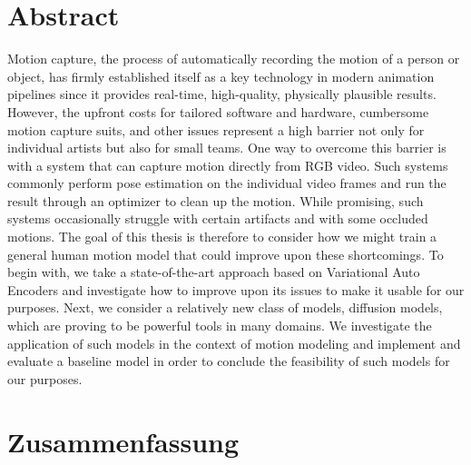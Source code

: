 \chapter*{Abstract}

Motion capture, the process of automatically recording the motion of a person or object, has firmly established itself as a key technology in modern animation pipelines since it provides real-time, high-quality, physically plausible results. However, the upfront costs for tailored software and hardware, cumbersome motion capture suits, and other issues represent a high barrier not only for individual artists but also for small teams. One way to overcome this barrier is with a system that can capture motion directly from RGB video. Such systems commonly perform pose estimation on the individual video frames and run the result through an optimizer to clean up the motion. While promising, such systems occasionally struggle with certain artifacts and with some occluded motions. The goal of this thesis is therefore to consider how we might train a general human motion model that could improve upon these shortcomings. To begin with, we take a state-of-the-art approach based on Variational Auto Encoders and investigate how to improve upon its issues to make it usable for our purposes. Next, we consider a relatively new class of models, diffusion models, which are proving to be powerful tools in many domains. We investigate the application of such models in the context of motion modeling and implement and evaluate a baseline model in order to conclude the feasibility of such models for our purposes.
 
\cleardoublepage
\chapter*{Zusammenfassung}

